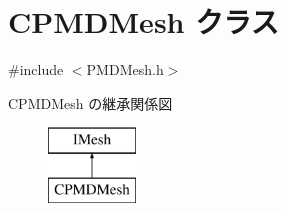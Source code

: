 \hypertarget{class_c_p_m_d_mesh}{}\section{C\+P\+M\+D\+Mesh クラス}
\label{class_c_p_m_d_mesh}


{\ttfamily \#include $<$P\+M\+D\+Mesh.\+h$>$}

C\+P\+M\+D\+Mesh の継承関係図\begin{figure}[H]
\begin{center}
\leavevmode
\includegraphics[height=2.000000cm]{class_c_p_m_d_mesh}
\end{center}
\end{figure}

